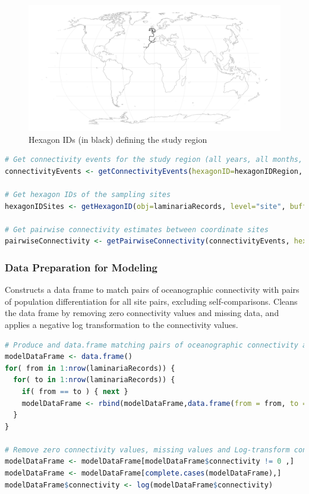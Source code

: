 \documentclass[
]{article}
\begin{document}
\begin{figure}
\centering
\includegraphics{../img/Example1_img_1.png}
\caption{Hexagon IDs (in black) defining the study region}
\end{figure}

\begin{lstlisting}[language=R]
# Get connectivity events for the study region (all years, all months, all days, 120 days period)
connectivityEvents <- getConnectivityEvents(hexagonID=hexagonIDRegion, period=120 )

# Get hexagon IDs of the sampling sites
hexagonIDSites <- getHexagonID(obj=laminariaRecords, level="site", buffer=0, print=FALSE)

# Get pairwise connectivity estimates between coordinate sites
pairwiseConnectivity <- getPairwiseConnectivity(connectivityEvents, hexagonIDFrom=hexagonIDSites, connType="Forward", value="Probability", steppingStone=TRUE)
\end{lstlisting}

\subsubsection{Data Preparation for
Modeling}\label{data-preparation-for-modeling}

Constructs a data frame to match pairs of oceanographic connectivity
with pairs of population differentiation for all site pairs, excluding
self-comparisons. Cleans the data frame by removing zero connectivity
values and missing data, and applies a negative log transformation to
the connectivity values.

\begin{lstlisting}[language=R]
# Produce and data.frame matching pairs of oceanographic connectivity and pairs of population differentiation 
modelDataFrame <- data.frame()
for( from in 1:nrow(laminariaRecords)) {
  for( to in 1:nrow(laminariaRecords)) {
    if( from == to ) { next }
    modelDataFrame <- rbind(modelDataFrame,data.frame(from = from, to = to, connectivity = mean(pairwiseConnectivity$connectivityMatrix[from,to], pairwiseConnectivity$connectivityMatrix[to,from], na.rm=T), differentiation = laminariaPopDifferentiation[from,to]))
  }
}

# Remove zero connectivity values, missing values and Log-transform connectivity
modelDataFrame <- modelDataFrame[modelDataFrame$connectivity != 0 ,]
modelDataFrame <- modelDataFrame[complete.cases(modelDataFrame),]
modelDataFrame$connectivity <- log(modelDataFrame$connectivity)
\end{lstlisting}
\end{document}
